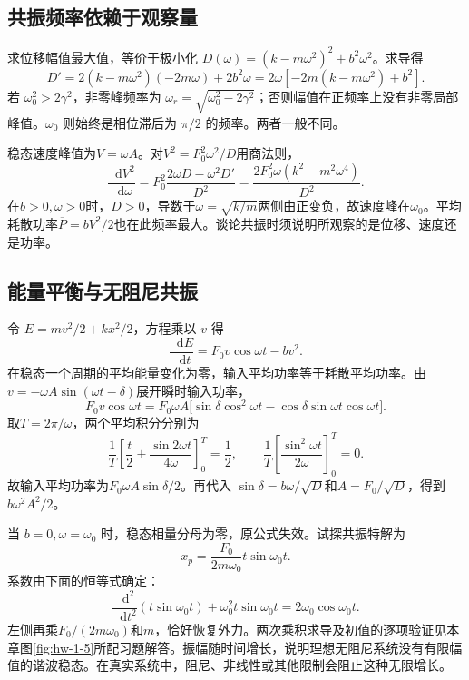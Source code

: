 \documentclass[11pt,openany,fontset=fandol]{ctexbook}
\theoremstyle{plain}\newtheorem{theorem}{定理}[chapter]\newtheorem{proposition}[theorem]{命题}
\theoremstyle{definition}\newtheorem{definition}{定义}[chapter]\newtheorem{example}{例}[chapter]
\theoremstyle{remark}\newtheorem*{remark}{说明}
\newcommand{\dd}{\mathop{}\!\mathrm d}\newcommand{\ii}{\mathrm i}\newcommand{\ee}{\mathrm e}
\begin{document}
\subsection{共振频率依赖于观察量}
求位移幅值最大值，等价于极小化 $D(\omega)=(k-m\omega^2)^2+b^2\omega^2$。求导得
\[
D'=2(k-m\omega^2)(-2m\omega)+2b^2\omega
=2\omega[-2m(k-m\omega^2)+b^2].
\]
若 $\omega_0^2>2\gamma^2$，非零峰频率为 $\omega_r=\sqrt{\omega_0^2-2\gamma^2}$；否则幅值在正频率上没有非零局部峰值。$\omega_0$ 则始终是相位滞后为 $\pi/2$ 的频率。两者一般不同。

稳态速度峰值为$V=\omega A$。对$V^2=F_0^2\omega^2/D$用商法则，
\[\frac{\dd V^2}{\dd\omega}
=F_0^2\frac{2\omega D-\omega^2D'}{D^2}
=\frac{2F_0^2\omega(k^2-m^2\omega^4)}{D^2}.\]
在$b>0,\omega>0$时，$D>0$，导数于$\omega=\sqrt{k/m}$两侧由正变负，故速度峰在$\omega_0$。平均耗散功率$\overline P=bV^2/2$也在此频率最大。谈论共振时须说明所观察的是位移、速度还是功率。

\subsection{能量平衡与无阻尼共振}
令 $E=mv^2/2+kx^2/2$，方程乘以 $v$ 得
\begin{equation}
\frac{\dd E}{\dd t}=F_0v\cos\omega t-bv^2.
\end{equation}
在稳态一个周期的平均能量变化为零，输入平均功率等于耗散平均功率。由$v=-\omega A\sin(\omega t-\delta)$展开瞬时输入功率，
\[F_0v\cos\omega t=F_0\omega A
\bigl[\sin\delta\cos^2\omega t-\cos\delta\sin\omega t\cos\omega t\bigr].\]
取$T=2\pi/\omega$，两个平均积分分别为
\[\frac1T\left[\frac t2+\frac{\sin2\omega t}{4\omega}\right]_0^T=\frac12,
\qquad
\frac1T\left[\frac{\sin^2\omega t}{2\omega}\right]_0^T=0.\]
故输入平均功率为$F_0\omega A\sin\delta/2$。再代入
$\sin\delta=b\omega/\sqrt D$和$A=F_0/\sqrt D$，得到$b\omega^2A^2/2$。

当 $b=0,\omega=\omega_0$ 时，稳态相量分母为零，原公式失效。试探共振特解为
\begin{equation}
x_p=\frac{F_0}{2m\omega_0}t\sin\omega_0t.
\end{equation}
系数由下面的恒等式确定：
\begin{equation}\label{eq:resonant-secular-identity}
\frac{\dd^2}{\dd t^2}(t\sin\omega_0t)
+\omega_0^2t\sin\omega_0t=2\omega_0\cos\omega_0t.
\end{equation}
左侧再乘$F_0/(2m\omega_0)$和$m$，恰好恢复外力。两次乘积求导及初值的逐项验证见本章图\ref{fig:hw-1-5}所配习题解答。振幅随时间增长，说明理想无阻尼系统没有有限幅值的谐波稳态。在真实系统中，阻尼、非线性或其他限制会阻止这种无限增长。
\end{document}
